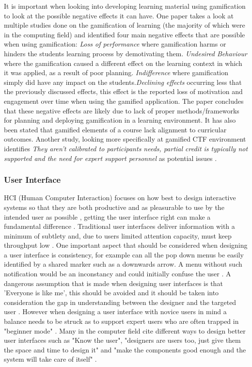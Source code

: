 \documentclass[12pt,a4paper]{article}
\begin{document}
It is important when looking into developing learning material using gamification to look at the possible negative effects it can have. One paper \cite{toda2017dark} takes a look at multiple studies done on the gamification of learning (the majority of which were in the computing field) and identified four main negative effects that are possible when using gamification: \emph{Loss of performance} where gamification harms or hinders the students learning process by demotivating them. \emph{Undesired Behaviour} where the gamification caused a different effect on the learning context in which it was applied, as a result of poor planning. \emph{Indifference} where gamification simply did have any impact on the students.\emph{Declining effects} occurring less that the previously discussed effects, this effect is the reported loss of motivation and engagement over time when using the gamified application. The paper concludes that these negative effects are likely due to lack of proper methods/frameworks for planning and deploying gamification in a learning environment. It has also been stated that gamified elements of a course lack alignment to curricular outcomes\cite{gonzalez2017cybersecurity}. Another study, looking more specifically at gamified CTF environment identifies \emph{They aren't calibrated to participants needs, partial credit is typically not supported and the need for expert support personnel} as potential issues \cite{katsantonis2017conceptual2}. 

\subsubsection{User Interface} 
HCI (Human Computer Interaction) focuses on how best to design interactive systems so that they are both productive and as pleasurable to use by the intended user as possible \cite{smith2006human}, getting the user interface right can make a fundamental difference \cite{ritter2014foundations1}. Traditional user interfaces deliver information with a minimum of subtlety and, due to users limited attention capacity, must keep throughput low \cite{bulling2016pervasive}.  One important aspect that should be considered when designing a user interface is consistency, for example can all the pop down menus be easily identified by a shared marker such as a downwards arrow. A menu without such notification would be an inconstancy and could initially confuse the user \cite{nielsen2014coordinating}. A dangerous assumption that is made when designing user interfaces is that 'Everyone is like me', this should be avoided and it should be taken into consideration the gap in understanding between the designer and the targeted user \cite{ritter2014foundations2}. However when designing a user interface with novice users in mind a balance needs to be struck as to support expert users who are often trapped in "beginner mode" \cite{cockburn2015supporting}. Many in the computer field cite different ways to design better user interfaces such as "Know the user", "designers are users too, just give them the space and time to design it" and "make the components good enough and the system will take care of itself" \cite{card2017psychology}.
\end{document}
